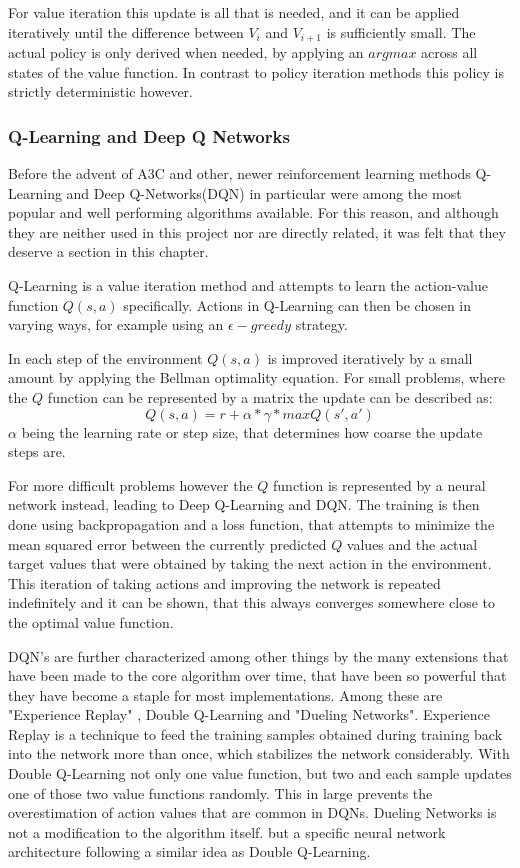 For value iteration this update is all that is needed, and it can be applied iteratively until the difference between $V_{i}$ and $V_{i+1}$ is sufficiently small.
The actual policy is only derived when needed, by applying an $argmax$ across all states of the value function. In contrast to policy iteration methods this policy is strictly deterministic however.

\subsubsection{Q-Learning and Deep Q Networks}
Before the advent of A3C and other, newer reinforcement learning methods Q-Learning \citep{DBLP:journals/ml/WatkinsD92} and Deep Q-Networks(DQN)\citep{DBLP:journals/nature/MnihKSRVBGRFOPB15} in particular were among the most popular and well performing algorithms available. For this reason, and although they are neither used in this project nor are directly related, it was felt that they deserve a section in this chapter. 

Q-Learning is a value iteration method and attempts to learn the action-value function $Q(s, a)$ specifically. Actions in Q-Learning can then  be chosen in varying ways, for example using an $\epsilon-greedy$ strategy. 

In each step of the environment $Q(s, a)$ is improved iteratively by a small amount by applying the Bellman optimality equation. For small problems, where the $Q$ function can be represented by a matrix the update can be described as:
$$
Q(s, a) = r + \alpha *\gamma * max Q(s',a')
$$
$\alpha$ being the learning rate or step size, that determines how coarse the update steps are.

For more difficult problems however the $Q$ function is represented by a neural network instead, leading to Deep Q-Learning and DQN. The training is then done using backpropagation and a loss function, that attempts to minimize the mean squared error between the currently predicted $Q$ values and the actual target values that were obtained by taking the next action in the environment.
This iteration of taking actions and improving the network is repeated indefinitely and it can be shown, that this always converges somewhere close to the optimal value function.

DQN's are further characterized among other things by the many extensions that have been made to the core algorithm over time, that have been so powerful that they have become a staple for most implementations. Among these are "Experience Replay" \citep{DBLP:journals/corr/abs-1712-01275}, Double Q-Learning \citep{DBLP:conf/aaai/HasseltGS16} and "Dueling Networks"\citep{DBLP:journals/corr/WangFL15}. Experience Replay is a technique to feed the training samples obtained during training back into the network more than once, which stabilizes the network considerably. With Double Q-Learning not only one value function, but two and each sample updates one of those two value functions randomly. This in large prevents the overestimation of action values that are common in DQNs. Dueling Networks is not a modification to the algorithm itself. but  a specific neural network architecture following a similar idea as Double Q-Learning.


